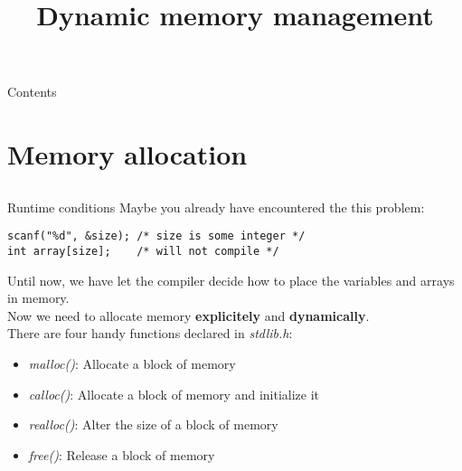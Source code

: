 
\newcommand{\topic}{
	Dynamic memory management
}
\usepackage{tikz}
\usetikzlibrary{arrows}
\usetikzlibrary{decorations.pathmorphing}

\title{\topic}
\supertitle{\course}
\date{}



\maketitle

\begin{frame}{Contents}
	\tableofcontents
\end{frame}

\section{Memory allocation}
\subsection{}
\begin{frame}[fragile]{Runtime conditions}
	Maybe you already have encountered the this problem:
	\begin{lstlisting}[numbers=none]
scanf("%d", &size);	/* size is some integer */
int array[size];	/* will not compile */
\end{lstlisting}
	Until now, we have let the compiler decide how to place the variables and arrays in memory.\\
	Now we need to allocate memory \textbf{explicitely} and \textbf{dynamically}.\\
	\bigskip
	There are four handy functions declared in \textit{stdlib.h}:
	\begin{itemize}
		\item \textit{malloc()}: Allocate a block of memory
		\item \textit{calloc()}: Allocate a block of memory and initialize it
		\item \textit{realloc()}: Alter the size of a block of memory
		\item \textit{free()}: Release a block of memory
	\end{itemize}
\end{frame}

